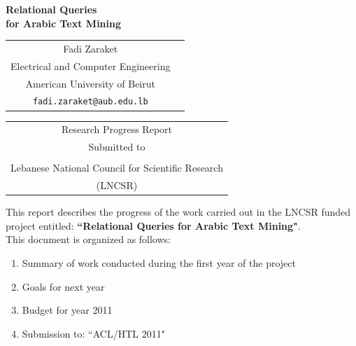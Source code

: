 \documentclass[12pt]{article}
\begin{document}
\pagestyle{fancy}
\chead{}
\rhead{}

\cfoot{}
\renewcommand{\footrulewidth}{0.2pt}
\renewcommand{\headrulewidth}{0.2pt}


\begin{center}
{\Large \bf Relational Queries \\
for Arabic Text Mining }

\vspace{1.5in}

\renewcommand{\arraystretch}{.6}
\begin{tabular}{cc}
Fadi Zaraket \\
Electrical and Computer Engineering  \\
American University of Beirut \\
{\tt fadi.zaraket@aub.edu.lb} 
\end{tabular}

\vspace{1.5in}

\renewcommand{\arraystretch}{.6}
\begin{tabular}{c}
{\small Research Progress Report } \\
{\small Submitted to }\\
\\
    Lebanese National Council for Scientific Research \\
    (LNCSR)
\end{tabular}
\vspace{.5in}

\date{\today}
\pagebreak

\end{center}


This report describes the progress of the work carried out in the LNCSR funded project entitled: {\bf ``Relational Queries for Arabic Text Mining"}. 
\\

This document is organized as follows:
\begin{enumerate}
\item Summary of work conducted during the first year of the project
\item Goals for next year
\item Budget for year 2011
\item Submission to: ``ACL/HTL 2011"
\end{enumerate}
\pagebreak
\end{document}
